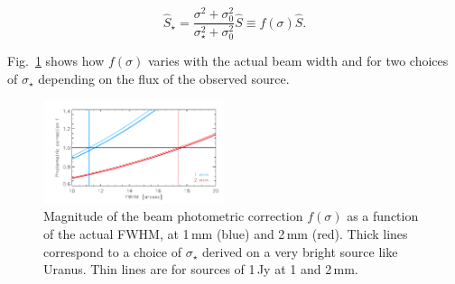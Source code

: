 \begin{equation}
\hat{S}_\star = \frac{\sigma^2 + \sigma_0^2}{\sigma_\star^2 + \sigma_0^2}\hat{S}
\equiv f(\sigma)\hat{S}.
\end{equation}

Fig.~\ref{fig:f_sigma} shows how $f(\sigma)$ varies with the actual beam width
and for two choices of $\sigma_\star$ depending on the flux of the observed source.

\begin{figure}[ht!]
  \begin{center}
    \includegraphics[clip=true, trim={0.9cm, 0.1cm, 0.5cm, 0.5cm}, width=0.4725\textwidth]{Figures/photometric_correction_function_1Jy.pdf}
    \caption[Photometric correction]{Magnitude of the beam photometric
      correction $f(\sigma)$ as a function of the actual FWHM, at 1\,mm (blue)
      and 2\,mm (red). Thick lines correspond to a choice of $\sigma_\star$
      derived on a very bright source like Uranus. Thin lines are for sources of
      1\,Jy at 1 and 2\,mm.}
\label{fig:f_sigma}
\end{center}
\end{figure}



